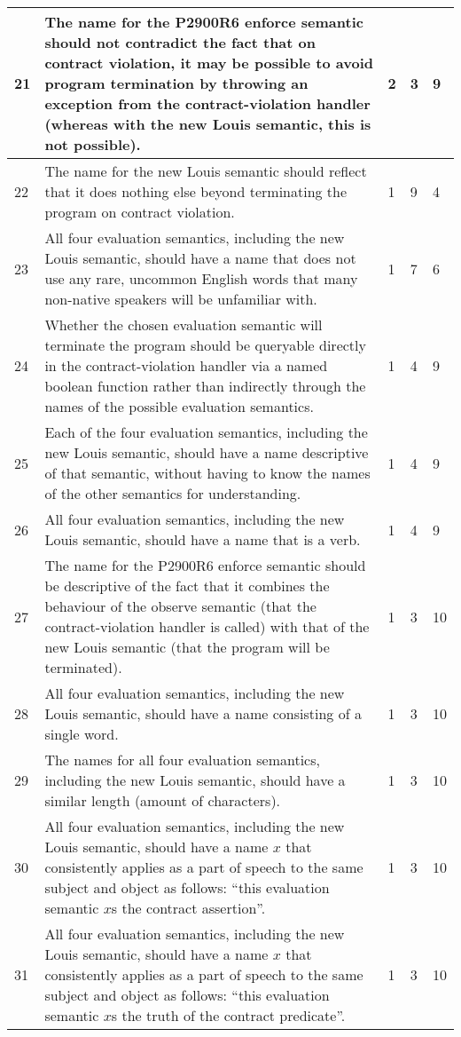 \begin{longtable}{|p{0.8cm}|p{11.5cm}|p{0.6cm}|p{0.6cm}|p{0.6cm}|}
21 & The name for the P2900R6 enforce semantic should not contradict the fact that on contract violation, it may be possible to avoid program termination by throwing an exception from the contract-violation handler (whereas with the new Louis semantic, this is not possible). & 2 & 3 & 9 \\ \hline
22 & The name for the new Louis semantic should reflect that it does nothing else beyond terminating the program on contract violation. & 1 & 9 & 4 \\ \hline
23 & All four evaluation semantics, including the new Louis semantic, should have a name that does not use any rare, uncommon English words that many non-native speakers will be unfamiliar with. & 1 & 7 & 6 \\ \hline
24 & Whether the chosen evaluation semantic will terminate the program should be queryable directly in the contract-violation handler via a named boolean function rather than indirectly through the names of the possible evaluation semantics. & 1 & 4 & 9 \\ \hline
25 & Each of the four evaluation semantics, including the new Louis semantic, should have a name descriptive of that semantic, without having to know the names of the other semantics for understanding. & 1 & 4 & 9 \\ \hline
26 & All four evaluation semantics, including the new Louis semantic, should have a name that is a verb. & 1 & 4 & 9 \\ \hline
27 & The name for the P2900R6 enforce semantic should be descriptive of the fact that it combines the behaviour of the observe semantic (that the contract-violation handler is called) with that of the new Louis semantic (that the program will be terminated). & 1 & 3 & 10 \\ \hline
28 & All four evaluation semantics, including the new Louis semantic, should have a name consisting of a single word. & 1 & 3 & 10 \\ \hline
29 & The names for all four evaluation semantics, including the new Louis semantic, should have a similar length (amount of characters). & 1 & 3 & 10 \\ \hline
30 & All four evaluation semantics, including the new Louis semantic, should have a name $x$ that consistently applies as a part of speech to the same subject and object as follows: ``this evaluation semantic $x$s the contract assertion''. & 1 & 3 & 10 \\ \hline
31 & All four evaluation semantics, including the new Louis semantic, should have a name $x$ that consistently applies as a part of speech to the same subject and object as follows: ``this evaluation semantic $x$s the truth of the contract predicate''. & 1 & 3 & 10 \\ \hline

\end{longtable}
